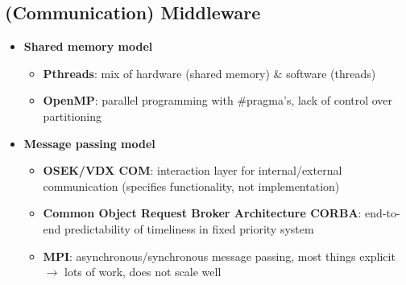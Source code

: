 \documentclass{article}
\begin{document}
\subsection{(Communication) Middleware}
\begin{itemize}
  \item \textbf{Shared memory model}
        \begin{itemize}
          \item \textbf{Pthreads}: mix of hardware (shared memory) \& software (threads)
          \item \textbf{OpenMP}: parallel programming with \#pragma's, lack of control over partitioning
        \end{itemize}
  \item \textbf{Message passing model}
        \begin{itemize}
          \item \textbf{OSEK/VDX COM}: interaction layer for internal/external communication (specifies functionality, not implementation)
          \item \textbf{Common Object Request Broker Architecture CORBA}: end-to-end predictability of timeliness in fixed priority system
          \item \textbf{MPI}: asynchronous/synchronous message passing, most things explicit $\to$ lots of work, does not scale well
        \end{itemize}
\end{itemize}
\end{document}
